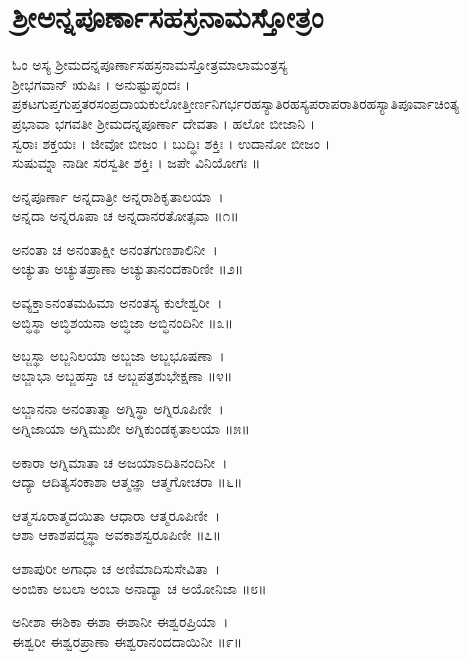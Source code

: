 \fancyhead[RL]{}
\section{ ಶ್ರೀಅನ್ನಪೂರ್ಣಾಸಹಸ್ರನಾಮಸ್ತೋತ್ರಂ }
ಓಂ ಅಸ್ಯ ಶ್ರೀಮದನ್ನಪೂರ್ಣಾಸಹಸ್ರನಾಮಸ್ತೋತ್ರಮಾಲಾಮಂತ್ರಸ್ಯ\\ ಶ್ರೀಭಗವಾನ್ ಋಷಿಃ । ಅನುಷ್ಟುಪ್ಛಂದಃ । ಪ್ರಕಟಗುಪ್ತಗುಪ್ತತರಸಂಪ್ರದಾಯಕುಲೋತ್ತೀರ್ಣನಿಗರ್ಭರಹಸ್ಯಾತಿರಹಸ್ಯಪರಾಪರಾತಿರಹಸ್ಯಾತಿಪೂರ್ವಾಚಿಂತ್ಯ\\ಪ್ರಭಾವಾ ಭಗವತೀ ಶ್ರೀಮದನ್ನಪೂರ್ಣಾ ದೇವತಾ । ಹಲೋ ಬೀಜಾನಿ । \\ಸ್ವರಾಃ ಶಕ್ತಯಃ । ಜೀವೋ ಬೀಜಂ । ಬುದ್ಧಿಃ ಶಕ್ತಿಃ । ಉದಾನೋ ಬೀಜಂ ।\\ ಸುಷುಮ್ನಾ ನಾಡೀ ಸರಸ್ವತೀ ಶಕ್ತಿಃ । ಜಪೇ ವಿನಿಯೋಗಃ ॥


ಅನ್ನಪೂರ್ಣಾ ಅನ್ನದಾತ್ರೀ ಅನ್ನರಾಶಿಕೃತಾಲಯಾ~।\\
ಅನ್ನದಾ ಅನ್ನರೂಪಾ ಚ ಅನ್ನದಾನರತೋತ್ಸವಾ ॥೧॥

ಅನಂತಾ ಚ ಅನಂತಾಕ್ಷೀ ಅನಂತಗುಣಶಾಲಿನೀ~।\\
ಅಚ್ಯುತಾ ಅಚ್ಯುತಪ್ರಾಣಾ ಅಚ್ಯುತಾನಂದಕಾರಿಣೀ ॥೨॥

ಅವ್ಯಕ್ತಾಽನಂತಮಹಿಮಾ ಅನಂತಸ್ಯ ಕುಲೇಶ್ವರೀ~।\\
ಅಬ್ಧಿಸ್ಥಾ ಅಬ್ಧಿಶಯನಾ ಅಬ್ಧಿಜಾ ಅಬ್ಧಿನಂದಿನೀ ॥೩॥

ಅಬ್ಜಸ್ಥಾ ಅಬ್ಜನಿಲಯಾ ಅಬ್ಜಜಾ ಅಬ್ಜಭೂಷಣಾ~।\\
ಅಬ್ಜಾಭಾ ಅಬ್ಜಹಸ್ತಾ ಚ ಅಬ್ಜಪತ್ರಶುಭೇಕ್ಷಣಾ ॥೪॥

ಅಬ್ಜಾನನಾ ಅನಂತಾತ್ಮಾ ಅಗ್ನಿಸ್ಥಾ ಅಗ್ನಿರೂಪಿಣೀ~।\\
ಅಗ್ನಿಜಾಯಾ ಅಗ್ನಿಮುಖೀ ಅಗ್ನಿಕುಂಡಕೃತಾಲಯಾ ॥೫॥

ಅಕಾರಾ ಅಗ್ನಿಮಾತಾ ಚ ಅಜಯಾಽದಿತಿನಂದಿನೀ~।\\
ಆದ್ಯಾ ಆದಿತ್ಯಸಂಕಾಶಾ ಆತ್ಮಜ್ಞಾ ಆತ್ಮಗೋಚರಾ ॥೬॥

ಆತ್ಮಸೂರಾತ್ಮದಯಿತಾ ಆಧಾರಾ ಆತ್ಮರೂಪಿಣೀ~।\\
ಆಶಾ ಆಕಾಶಪದ್ಮಸ್ಥಾ ಅವಕಾಶಸ್ವರೂಪಿಣೀ ॥೭॥

ಆಶಾಪುರೀ ಅಗಾಧಾ ಚ ಅಣಿಮಾದಿಸುಸೇವಿತಾ~।\\
ಅಂಬಿಕಾ ಅಬಲಾ ಅಂಬಾ ಅನಾದ್ಯಾ ಚ ಅಯೋನಿಜಾ ॥೮॥

ಅನೀಶಾ ಈಶಿಕಾ ಈಶಾ ಈಶಾನೀ ಈಶ್ವರಪ್ರಿಯಾ~।\\
ಈಶ್ವರೀ ಈಶ್ವರಪ್ರಾಣಾ ಈಶ್ವರಾನಂದದಾಯಿನೀ ॥೯॥

